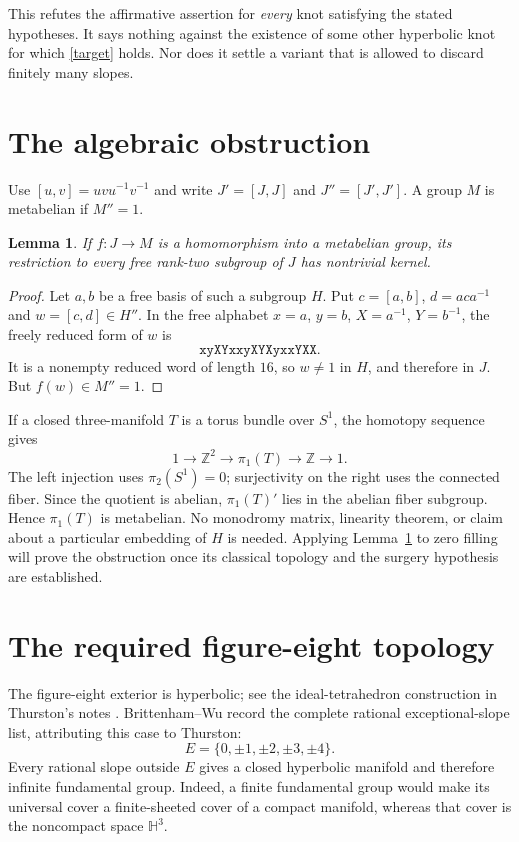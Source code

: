 \documentclass[11pt]{article}
\newtheorem{lemma}{Lemma}
\newcommand{\Z}{\mathbb Z}
\begin{document}
This refutes the affirmative assertion for \emph{every} knot satisfying
the stated hypotheses. It says nothing against the existence of some other
hyperbolic knot for which \eqref{target} holds. Nor does it settle a variant
that is allowed to discard finitely many slopes.

\section{The algebraic obstruction}
Use $[u,v]=uvu^{-1}v^{-1}$ and write $J'=[J,J]$ and $J''=[J',J']$.
A group $M$ is metabelian if $M''=1$.

\begin{lemma}\label{law}
If $f:J\to M$ is a homomorphism into a metabelian group, its restriction
to every free rank-two subgroup of $J$ has nontrivial kernel.
\end{lemma}
\begin{proof}
Let $a,b$ be a free basis of such a subgroup $H$. Put
$c=[a,b]$, $d=aca^{-1}$ and $w=[c,d]\in H''$.
In the free alphabet $x=a$, $y=b$, $X=a^{-1}$, $Y=b^{-1}$, the freely
reduced form of $w$ is
\[
 \texttt{xyXYxxyXYXyxxYXX}.
\]
It is a nonempty reduced word of length $16$, so $w\ne1$ in $H$, and
therefore in $J$. But $f(w)\in M''=1$.
\end{proof}

If a closed three-manifold $T$ is a torus bundle over $S^1$, the homotopy
sequence gives
\begin{equation}\label{extension}
 1\longrightarrow\Z^2\longrightarrow\pi_1(T)
 \longrightarrow\Z\longrightarrow1.
\end{equation}
The left injection uses $\pi_2(S^1)=0$; surjectivity on the right uses the
connected fiber. Since the quotient is abelian, $\pi_1(T)'$ lies in the
abelian fiber subgroup. Hence $\pi_1(T)$ is metabelian. No monodromy matrix,
linearity theorem, or claim about a particular embedding of $H$ is needed.
Applying Lemma~\ref{law} to zero filling will prove the obstruction once
its classical topology and the surgery hypothesis are established.

\section{The required figure-eight topology}
The figure-eight exterior is hyperbolic; see the ideal-tetrahedron
construction in Thurston's notes \cite[Chapter~4]{Th}.
Brittenham--Wu \cite[Theorem~1.1(4)]{BW} record the complete rational
exceptional-slope list, attributing this case to Thurston:
\[
 E=\{0,\pm1,\pm2,\pm3,\pm4\}.
\]
Every rational slope outside $E$ gives a closed hyperbolic manifold and
therefore infinite fundamental group. Indeed, a finite fundamental group
would make its universal cover a finite-sheeted cover of a compact
manifold, whereas that cover is the noncompact space $\mathbb H^3$.
\end{document}
